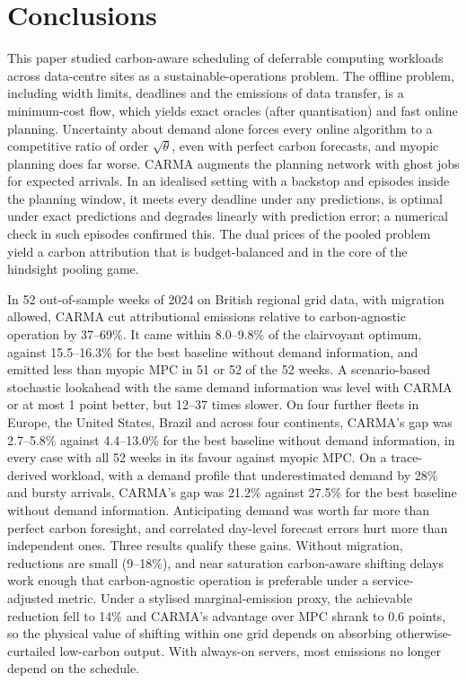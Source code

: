 \section{Conclusions}\label{sec:conclusion}

This paper studied carbon-aware scheduling of deferrable computing workloads across data-centre sites as a sustainable-operations problem. The offline problem, including width limits, deadlines and the emissions of data transfer, is a minimum-cost flow, which yields exact oracles (after quantisation) and fast online planning. Uncertainty about demand alone forces every online algorithm to a competitive ratio of order $\sqrt\theta$, even with perfect carbon forecasts, and myopic planning does far worse. CARMA augments the planning network with ghost jobs for expected arrivals. In an idealised setting with a backstop and episodes inside the planning window, it meets every deadline under any predictions, is optimal under exact predictions and degrades linearly with prediction error; a numerical check in such episodes confirmed this. The dual prices of the pooled problem yield a carbon attribution that is budget-balanced and in the core of the hindsight pooling game.

In 52 out-of-sample weeks of 2024 on British regional grid data, with migration allowed, CARMA cut attributional emissions relative to carbon-agnostic operation by 37--69\%. It came within 8.0--9.8\% of the clairvoyant optimum, against 15.5--16.3\% for the best baseline without demand information, and emitted less than myopic MPC in 51 or 52 of the 52 weeks. A scenario-based stochastic lookahead with the same demand information was level with CARMA or at most 1 point better, but 12--37 times slower. On four further fleets in Europe, the United States, Brazil and across four continents, CARMA's gap was 2.7--5.8\% against 4.4--13.0\% for the best baseline without demand information, in every case with all 52 weeks in its favour against myopic MPC. On a trace-derived workload, with a demand profile that underestimated demand by 28\% and bursty arrivals, CARMA's gap was 21.2\% against 27.5\% for the best baseline without demand information. Anticipating demand was worth far more than perfect carbon foresight, and correlated day-level forecast errors hurt more than independent ones. Three results qualify these gains. Without migration, reductions are small (9--18\%), and near saturation carbon-aware shifting delays work enough that carbon-agnostic operation is preferable under a service-adjusted metric. Under a stylised marginal-emission proxy, the achievable reduction fell to 14\% and CARMA's advantage over MPC shrank to 0.6 points, so the physical value of shifting within one grid depends on absorbing otherwise-curtailed low-carbon output. With always-on servers, most emissions no longer depend on the schedule.

